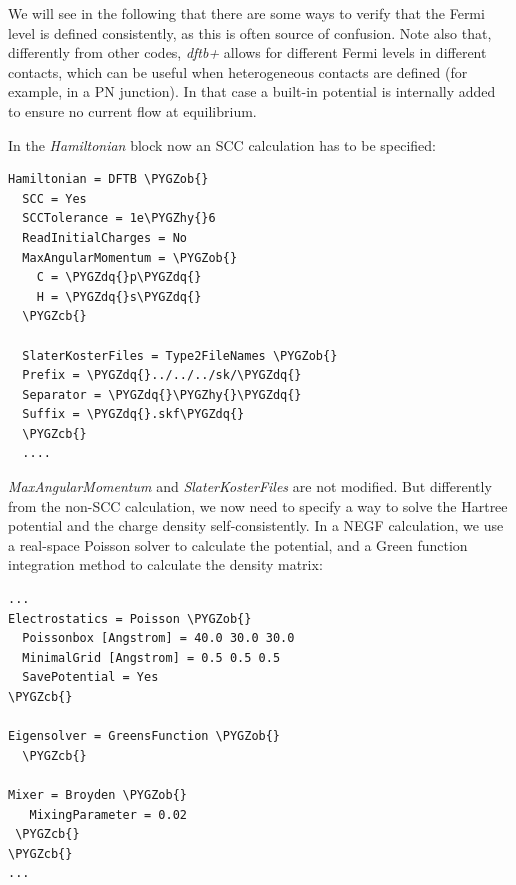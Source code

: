 \documentclass[a4paper,11pt,english]{sphinxmanual}
\def\PYGZob{\char`\{}
\def\PYGZcb{\char`\}}
\def\PYGZhy{\char`\-}
\def\PYGZdq{\char`\"}
\begin{document}
{{We will see in the following that there are some ways to verify that
the Fermi level is defined consistently, as this is often source of
confusion. Note also that, differently from other codes, \emph{dftb+} allows
for different Fermi levels in different contacts, which can be useful
when heterogeneous contacts are defined (for example, in a PN
junction). In that case a built-in potential is internally added to
ensure no current flow at equilibrium.

In the \emph{Hamiltonian} block now an SCC calculation has to be
specified:

\begin{Verbatim}[commandchars=\\\{\}]
Hamiltonian = DFTB \PYGZob{}
  SCC = Yes
  SCCTolerance = 1e\PYGZhy{}6
  ReadInitialCharges = No
  MaxAngularMomentum = \PYGZob{}
    C = \PYGZdq{}p\PYGZdq{}
    H = \PYGZdq{}s\PYGZdq{}
  \PYGZcb{}

  SlaterKosterFiles = Type2FileNames \PYGZob{}
  Prefix = \PYGZdq{}../../../sk/\PYGZdq{}
  Separator = \PYGZdq{}\PYGZhy{}\PYGZdq{}
  Suffix = \PYGZdq{}.skf\PYGZdq{}
  \PYGZcb{}
  ....
\end{Verbatim}

\emph{MaxAngularMomentum} and \emph{SlaterKosterFiles} are not modified. But
differently from the non-SCC calculation, we now need to specify a way
to solve the Hartree potential and the charge density
self-consistently. In a NEGF calculation, we use a real-space Poisson
solver to calculate the potential, and a Green function integration
method to calculate the density matrix:

\begin{Verbatim}[commandchars=\\\{\}]
...
Electrostatics = Poisson \PYGZob{}
  Poissonbox [Angstrom] = 40.0 30.0 30.0
  MinimalGrid [Angstrom] = 0.5 0.5 0.5
  SavePotential = Yes
\PYGZcb{}

Eigensolver = GreensFunction \PYGZob{}
  \PYGZcb{}

Mixer = Broyden \PYGZob{}
   MixingParameter = 0.02
 \PYGZcb{}
\PYGZcb{}
...
\end{Verbatim}

}}
\end{document}
